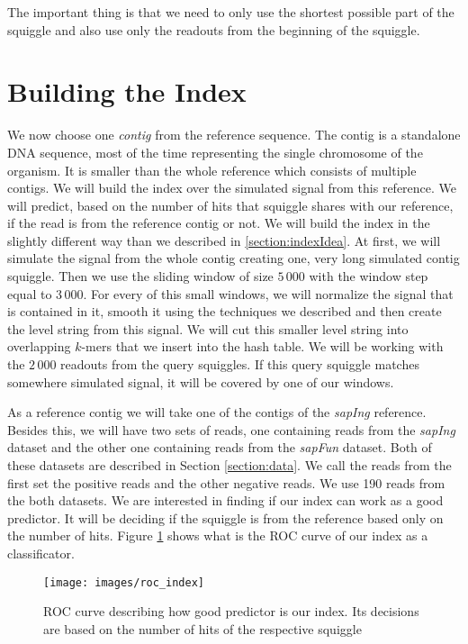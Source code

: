 The important thing is that we need to only use the shortest possible part of the squiggle
and also use only the readouts from the beginning of the squiggle.

\section{Building the Index}

We now choose one \textit{contig} from the reference sequence. The contig is a
standalone DNA sequence, most of the time representing the single chromosome
of the organism. It is smaller than the whole reference which consists of multiple contigs.
We will build the index over the simulated signal from this reference. We will predict,
based on the number of hits that squiggle shares with our reference, if the read is from the reference contig
or not. We will build the index in the slightly different way than we described in \ref{section:indexIdea}.
At first, we will simulate the signal from the whole contig creating one, very long simulated contig squiggle.
Then we use the sliding window of size $5\,000$ with the window step equal to $3\,000$.
For every of this small windows, we will normalize the signal that is contained in it, smooth
it using the techniques we described and then create the level string from this signal.
We will cut this smaller level string into overlapping $k$-mers that we insert into the
hash table. We will be working with the $2\,000$ readouts from the query squiggles. If this
query squiggle matches somewhere simulated signal, it will be covered by one of our windows.

As a reference contig we will take one of the contigs of the \textit{sapIng} reference.
Besides this, we will have two sets of reads, one containing reads from the \textit{sapIng}
dataset and the other one containing reads from the \textit{sapFun} dataset. Both of these datasets
are described in Section \ref{section:data}. We call the reads from the first set the
positive reads and the other negative reads. We use 190 reads from the both datasets.
We are interested in finding if our index can work as a good predictor. It will be
deciding if the squiggle is from the reference based only on the number of hits.
Figure \ref{obr:roc_index} shows what is the ROC curve of our index as a classificator.

\begin{figure}
\centerline{\texttt{[image: images/roc\_index]}}
\caption[TODO]{ROC curve describing how good predictor is our index. Its decisions
are based on the number of hits of the respective squiggle}
\label{obr:roc_index}
\end{figure}

